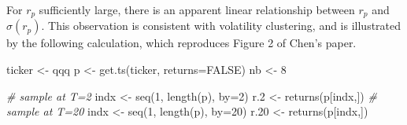 \documentclass[
  11pt,
]{article}
\newenvironment{Shaded}{\begin{snugshade}}{\end{snugshade}}
\newcommand{\AttributeTok}[1]{\textcolor[rgb]{0.77,0.63,0.00}{#1}}
\newcommand{\CommentTok}[1]{\textcolor[rgb]{0.56,0.35,0.01}{\textit{#1}}}
\newcommand{\ConstantTok}[1]{\textcolor[rgb]{0.00,0.00,0.00}{#1}}
\newcommand{\DecValTok}[1]{\textcolor[rgb]{0.00,0.00,0.81}{#1}}
\newcommand{\FloatTok}[1]{\textcolor[rgb]{0.00,0.00,0.81}{#1}}
\newcommand{\FunctionTok}[1]{\textcolor[rgb]{0.00,0.00,0.00}{#1}}
\newcommand{\NormalTok}[1]{#1}
\newcommand{\OtherTok}[1]{\textcolor[rgb]{0.56,0.35,0.01}{#1}}
\newcommand{\StringTok}[1]{\textcolor[rgb]{0.31,0.60,0.02}{#1}}
\begin{document}
For \(r_p\) sufficiently large, there is an apparent linear relationship
between \(r_p\) and \(\sigma(r_p)\). This observation is consistent with
volatility clustering, and is illustrated by the following calculation,
which reproduces Figure 2 of Chen's paper.

\begin{Shaded}
\begin{Highlighting}[]
\NormalTok{ticker }\OtherTok{\textless{}{-}} \StringTok{\textquotesingle{}qqq\textquotesingle{}}
\NormalTok{p }\OtherTok{\textless{}{-}} \FunctionTok{get.ts}\NormalTok{(ticker, }\AttributeTok{returns=}\ConstantTok{FALSE}\NormalTok{)}
\NormalTok{nb }\OtherTok{\textless{}{-}} \DecValTok{8}

\CommentTok{\# sample at T=2}
\NormalTok{indx }\OtherTok{\textless{}{-}} \FunctionTok{seq}\NormalTok{(}\DecValTok{1}\NormalTok{, }\FunctionTok{length}\NormalTok{(p), }\AttributeTok{by=}\DecValTok{2}\NormalTok{)}
\NormalTok{r}\FloatTok{.2} \OtherTok{\textless{}{-}} \FunctionTok{returns}\NormalTok{(p[indx,])}
\CommentTok{\# sample at T=20}
\NormalTok{indx }\OtherTok{\textless{}{-}} \FunctionTok{seq}\NormalTok{(}\DecValTok{1}\NormalTok{, }\FunctionTok{length}\NormalTok{(p), }\AttributeTok{by=}\DecValTok{20}\NormalTok{)}
\NormalTok{r}\FloatTok{.20} \OtherTok{\textless{}{-}} \FunctionTok{returns}\NormalTok{(p[indx,])}
\end{Highlighting}
\end{Shaded}
\end{document}
